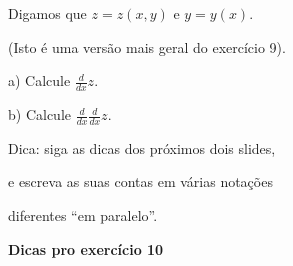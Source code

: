 \documentclass[oneside,12pt]{article}
\begin{document}
Digamos que $z=z(x,y)$ e $y=y(x)$.

(Isto é uma versão mais geral do exercício 9).

\ssk

a) Calcule $\frac{d}{dx}z$.

\ssk

b) Calcule $\frac{d}{dx}\frac{d}{dx}z$.

\bsk
\bsk

Dica: siga as dicas dos próximos dois slides,

e escreva as suas contas em várias notações

diferentes ``em paralelo''.




\newpage


{\bf Dicas pro exercício 10}

\def\parenarl#1{\left(\begin{array}{l} #1 \end{array}\right)}
\def\aname#1{[\mathsf{A#1}]}
\end{document}
